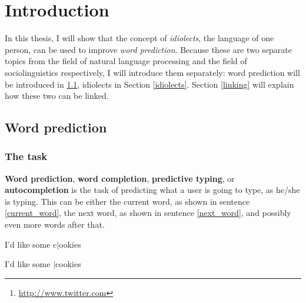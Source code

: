 \documentclass[11pt]{article}
\begin{document}
\begin{abstract}
To test this all on a much larger scale, I used Twitter\footnote{\url{http://www.twitter.com}}. During the spring of 2013, all tweets from a large group of Twitter users were (automatically) collected. For the 100 most active ones, Soothsayer then tried to predict the later tweets on the basis of earlier tweets. Most keystrokes could have been saved when using the idiolect model, with the recency buffer and the general language model in the background. 

Because Twitter also has information on which users talk to each other a lot, I also tried \emph{sociolect} models. These models are based on the tweets of a particular person \emph{and} the tweets of the people he/she often communicates with. The idea behind is that people who often communicate start to talk alike; in other words, the language of the friends of person $x$ can be helpful in trying to predict was person $x$ is going to say. This approach improved the results even further. For a number of users, more than 50\% of the keystrokes could have been saved if they had used Soothsayer. 
\end{abstract}

\section{Introduction} \label{intro}

In this thesis, I will show that the concept of \emph{idiolects}, the language of one person, can be used to improve \emph{word prediction}. Because these are two separate topics from the field of natural language processing and the field of sociolinguistics respectively, I will introduce them separately: word prediction will be introduced in \ref{word_prediction}, idiolects in Section \ref{idiolects}. Section \ref{linking} will explain how these two can be linked.

\subsection{Word prediction} \label{word_prediction}

\subsubsection{The task}

\textbf{Word prediction}, \textbf{word completion}, \textbf{predictive typing}, or \textbf{autocompletion} is the task of predicting what a user is going to type, as he/she is typing. This can be either the current word, as shown in sentence \ref{current_word}, the next word, as shown in sentence \ref{next_word}, and possibly even more words after that. 
\begin{examples}
\item I'd like some c$|$ookies \label{current_word}
\item I'd like some $|$cookies \label{next_word}
\end{examples}
\end{document}
